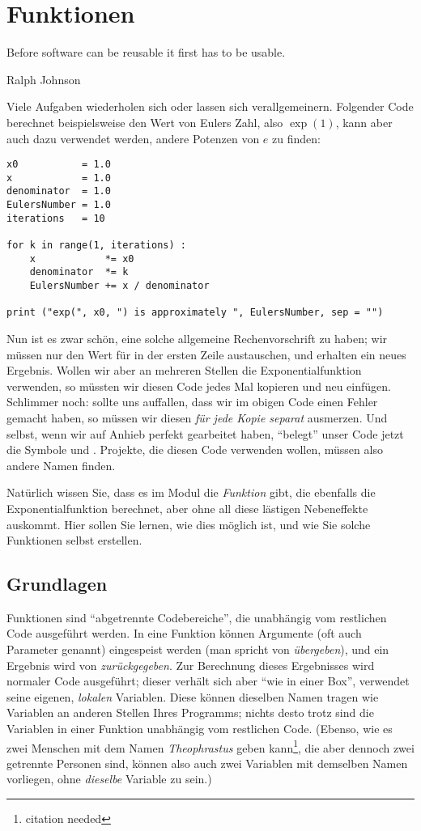 \chapter{Funktionen}
\label{chp:Funcs}
\epigraph{
	Before software can be reusable it first has to be usable.
}{Ralph Johnson}

Viele Aufgaben wiederholen sich oder lassen sich verallgemeinern. Folgender Code berechnet beispielsweise den Wert von Eulers Zahl, also $\exp(1)$, kann aber auch dazu verwendet werden, andere Potenzen von $e$ zu finden:

\begin{codebox}
\begin{verbatim}
x0           = 1.0
x            = 1.0
denominator  = 1.0
EulersNumber = 1.0
iterations   = 10

for k in range(1, iterations) :
    x            *= x0
    denominator  *= k
    EulersNumber += x / denominator

print ("exp(", x0, ") is approximately ", EulersNumber, sep = "")
\end{verbatim}
\end{codebox}

Nun ist es zwar schön, eine solche allgemeine Rechenvorschrift zu haben; wir müssen nur den Wert für  in der ersten Zeile austauschen, und erhalten ein neues Ergebnis. Wollen wir aber an mehreren Stellen die Exponentialfunktion verwenden, so müssten wir diesen Code jedes Mal kopieren und neu einfügen. Schlimmer noch: sollte uns auffallen, dass wir im obigen Code einen Fehler gemacht haben, so müssen wir diesen \emph{für jede Kopie separat} ausmerzen. Und selbst, wenn wir auf Anhieb perfekt gearbeitet haben, \enquote{belegt} unser Code jetzt \ua die Symbole  und . Projekte, die diesen Code verwenden wollen, müssen also andere Namen finden.

Natürlich wissen Sie, dass es im Modul  die \emph{Funktion}  gibt, die ebenfalls die Exponentialfunktion berechnet, aber ohne all diese lästigen Nebeneffekte auskommt. Hier sollen Sie lernen, wie dies möglich ist, und wie Sie solche Funktionen selbst erstellen.

\section{Grundlagen}
Funktionen sind \enquote{abgetrennte Codebereiche}, die unabhängig vom restlichen Code ausgeführt werden. In eine Funktion können Argumente (oft auch Parameter genannt) eingespeist werden (man spricht von \emph{übergeben}), und ein Ergebnis wird von  \emph{zurückgegeben}. Zur Berechnung dieses Ergebnisses wird normaler Code ausgeführt; dieser verhält sich aber \enquote{wie in einer Box}, \ie verwendet seine eigenen, \emph{lokalen} Variablen. Diese können dieselben Namen tragen wie Variablen an anderen Stellen Ihres Programms; nichts desto trotz sind die Variablen in einer Funktion unabhängig vom restlichen Code. (Ebenso, wie es zwei Menschen mit dem Namen \emph{Theophrastus} geben kann\footnote{citation needed}, die aber dennoch zwei getrennte Personen sind, können also auch zwei Variablen mit demselben Namen vorliegen, ohne \emph{dieselbe} Variable zu sein.)

